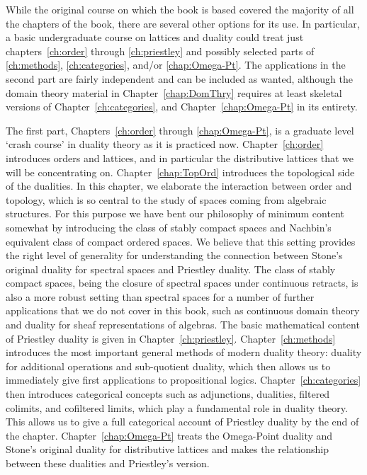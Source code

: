 While the original course on which the book is based covered the majority of all the chapters of the book, there are several other options for its use. In particular, a basic undergraduate course on lattices and duality could treat just chapters~\ref{ch:order} through \ref{ch:priestley} and possibly selected parts of \ref{ch:methods}, \ref{ch:categories}, and/or \ref{chap:Omega-Pt}. The applications in the second part are fairly independent and can be included as wanted, although the domain theory material in Chapter~\ref{chap:DomThry} requires at least skeletal versions of Chapter~\ref{ch:categories}, and Chapter~\ref{chap:Omega-Pt} in its entirety.

The first part, Chapters~\ref{ch:order} through \ref{chap:Omega-Pt}, is a graduate level `crash course' in duality theory as it is practiced now. Chapter~\ref{ch:order} introduces orders and lattices, and in particular the distributive lattices that we will be concentrating on. Chapter~\ref{chap:TopOrd} introduces the topological side of the dualities. In this chapter, we elaborate the interaction between order and topology, which is so central to the study of spaces coming from algebraic structures. For this purpose we have bent our philosophy of minimum content somewhat by introducing the class of stably compact spaces and Nachbin's equivalent class of compact ordered spaces. We believe that this setting provides the right level of generality for understanding the connection between Stone's original duality for spectral spaces and Priestley duality. The class of stably compact spaces, being the closure of spectral spaces under continuous retracts, is also a more robust setting than spectral spaces for a number of further applications that we do not cover in this book, such as continuous domain theory and duality for sheaf representations of algebras. The basic mathematical content of Priestley duality is given in Chapter~\ref{ch:priestley}. Chapter~\ref{ch:methods} introduces the most important general methods of modern duality theory: duality for additional operations and sub-quotient duality, which then allows us to immediately give first applications to propositional logics. Chapter~\ref{ch:categories} then introduces categorical concepts such as adjunctions, dualities, filtered colimits, and cofiltered limits, which play a fundamental role in duality theory. This allows us to give a full categorical account of Priestley duality by the end of the chapter. Chapter~\ref{chap:Omega-Pt} treats the Omega-Point duality and Stone's original duality for distributive lattices and makes the relationship between these dualities and Priestley's version.

